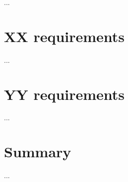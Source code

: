 
...

\section{XX requirements}
\label{sec:xx-requirements}
  
...

\section{YY requirements}
\label{sec:yy-requirements}

...

\section{Summary}
...
